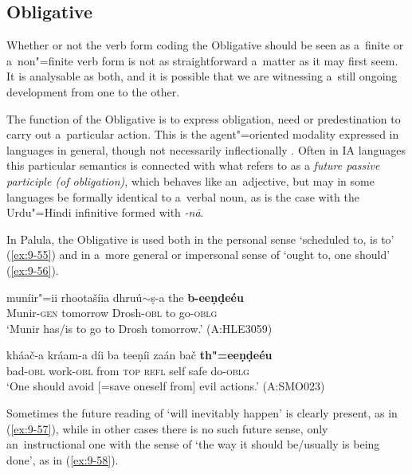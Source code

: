 \subsection{Obligative}
\label{subsec:9-2-3}

Whether or not the verb form coding the Obligative should be seen as a~finite or a~non"=finite verb form is not as straightforward a~matter as it may first seem. It is analysable as both, and it is possible that we are witnessing a~still ongoing development from one to the other. 



The function of the Obligative is to express obligation, need or predestination to carry out a~particular action. This is the agent"=oriented modality expressed in languages in general, though not necessarily inflectionally \citep[177--187]{bybeeetal1994}. Often in IA languages this particular semantics is connected with what \citet[322]{masica1991} refers to as a \textit{future passive participle (of obligation)}, which behaves like an~adjective, but may in some languages be formally identical to a~verbal noun, as is the case with the Urdu"=Hindi infinitive formed with \textit{-nā}. 



In Palula, the Obligative is used both in the personal sense `scheduled to, is to' (\ref{ex:9-55}) and in a~more general or impersonal sense of `ought to, one should' (\ref{ex:9-56}).

\begin{exe}
\ex
\label{ex:9-55}
\gll muníir"=ii rhootašíia dhruú$\sim$ṣ-a the \textbf{b-eeṇḍeéu} \\
Munir-\textsc{gen } tomorrow Drosh-\textsc{obl} to go-\textsc{oblg} \\
\glt `Munir has/is to go to Drosh tomorrow.' (A:HLE3059)

\ex
\label{ex:9-56}
\gll kháač-a kráam-a díi ba teeṇíi zaán bač \textbf{th"=eeṇḍeéu} \\
bad-\textsc{obl} work-\textsc{obl} from \textsc{top} \textsc{refl} self safe do-\textsc{oblg} \\
\glt `One should avoid [=save oneself from] evil actions.' (A:SMO023)
\end{exe}

Sometimes the future reading of `will inevitably happen' is clearly present, as in (\ref{ex:9-57}), while in other cases there is no such future sense, only an~instructional one with the sense of `the way it should be/usually is being done', as in (\ref{ex:9-58}).

